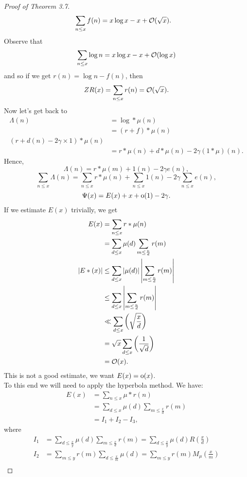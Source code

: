 \documentclass[twoside, openright, fontsize=10pt, headings=big]{scrbook}
\begin{document}
\begin{proof}[Proof of Theorem 3.7]
\begin{align*}
        \sum_{n\leq x}f(n)&=x\log x-x+\mathcal{O}(\sqrt{x}).
    \end{align*}
    Observe that
    \[
        \sum_{n\leq x}\log n=x\log x-x+\mathcal{O}(\log x)
    \]
    and so if we get $r(n)=\log n-f(n)$, then 
    \[Z
        R(x)=\sum_{n\leq x}r(n)=\mathcal{O}(\sqrt{x}).
    \]
    Now let's get back to
    \begin{align*}
        \Lambda(n)&=\log\ast\mu(n)\\
        &=(r+f)\ast\mu(n)\\
        (r+d(n)-2\gamma\times1)\ast\mu(n)\\
        &=r\ast\mu(n)+d\ast\mu(n)-2\gamma(1\ast\mu)(n).
    \end{align*}
    Hence, 
    \[
        \Lambda(n)=r\ast\mu(m)+1(n)-2\gamma e(n),
    \]
    \[
        \sum_{n\leq x}\Lambda(n)=\sum_{n\leq x}r\ast\mu(n)+\sum_{n\leq x}1(n)-2\gamma\sum_{n\leq x}e(n),
    \]
    \[
        \Psi(x)=E(x)+x+\text{o}(1)-2\gamma.
    \]
    If we estimate $E(x)$ trivially, we get
    \begin{align*}
        E(x)&=\sum_{n\leq x}r\ast\mu(n)\\
        &=\sum_{d\leq x}\mu(d)\sum_{m\leq\frac{n}{d}}r(m)\\
        |E*(x)|&\leq\sum_{d\leq x}|\mu(d)|\left|\sum_{m\leq\frac{n}{d}}r(m)\right|\\
        &\leq\sum_{d\leq x}\left|\sum_{m\leq\frac{n}{d}}r(m)\right|\\
        &\ll\sum_{d\leq x}\left(\sqrt{\frac{x}{d}}\right)\\
        &=\sqrt{x}\sum_{d\leq x}\left(\frac{1}{\sqrt{d}}\right)\\
        &=\mathcal{O}(x).
    \end{align*}
    This is not a good estimate, we want $E(x)=\text{o}(x)$.\\
    To this end we will need to apply the hyperbola method. We have:
    \begin{align*}
        E(x)&=\sum_{n\leq x}\mu\ast r(n)\\
        &=\sum_{d\leq x}\mu(d)\sum_{m\leq\frac{x}{d}}r(m)\\
        &=I_1+I_2-I_3,
    \end{align*}
    where
    \begin{align*}
        I_1&=\sum_{d\leq\frac{x}{y}}\mu(d)\sum_{m\leq\frac{x}{d}}r(m)=\sum_{d\leq\frac{x}{y}}\mu(d)R\left(\frac{x}{d}\right)\\
        I_2&=\sum_{m\leq y}r(m)\sum_{d\leq\frac{x}{m}}\mu(d)=\sum_{m\leq y}r(m)M_{\mu}\left(\frac{x}{m}\right)\\

\end{align*}
\end{proof}
\end{document}

